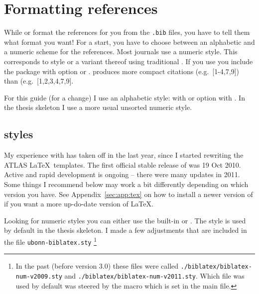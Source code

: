\section{Formatting references}
\label{sec:ref:format}

While \BibTeX{} or  format the references for you
from the \texttt{.bib} files, you have to tell them what format you
want!  For a start, you have to choose between an alphabetic and a
numeric scheme for the references. Most journals use a numeric
style. This corresponds to style  or a variant thereof
using traditional \BibTeX.  If you use  you include the
package with option  or
.  produces more compact
citations (e.g.\ [1-4,7,9]) than  (e.g.\
[1,2,3,4,7,9].

For this guide (for a change) I use an alphabetic style:
 with \BibTeX{} or option  with
\Package{biblatex}. In the thesis skeleton I use a more usual unsorted
numeric style.


\subsection{\Package{biblatex} styles}
\label{sec:ref:bbx}

My experience with  has taken off in the last year, 
since I started rewriting the ATLAS \LaTeX\ templates.
The first official stable release of  was 19 Oct 2010.
Active and rapid development is ongoing -- there were many updates in 2011.
Some things I recommend below may work a bit differently depending on which version
you have. See Appendix~\ref{sec:app:tex} on how to install a newer
version of \TeXLive if you want a more up-do-date version of \LaTeX.

Looking for numeric styles you can either use the built-in
 or .  The 
style is used by default in the thesis skeleton. I made a few
adjustments that are included in the file
\texttt{ubonn-biblatex.sty}%
\footnote{In the past (before version 3.0) these files were called
  \texttt{./biblatex/biblatex-num-v2009.sty} and
  \texttt{./biblatex/biblatex-num-v2011.sty}. Which file was used
  by default was steered by the \Macro{texlive} macro which is set in the
  main file.}

